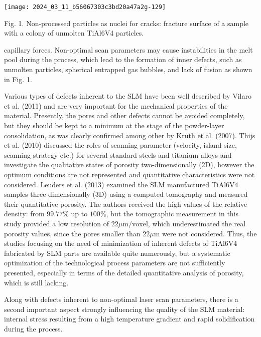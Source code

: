 \documentclass[10pt]{article}
\begin{document}
\begin{center}
\texttt{[image: 2024\_03\_11\_b56067303c3bd20a47a2g-129]}
\end{center}

Fig. 1. Non-processed particles as nuclei for cracks: fracture surface of a sample with a colony of unmolten TiAl6V4 particles.

capillary forces. Non-optimal scan parameters may cause instabilities in the melt pool during the process, which lead to the formation of inner defects, such as unmolten particles, spherical entrapped gas bubbles, and lack of fusion as shown in Fig. 1.

Various types of defects inherent to the SLM have been well described by Vilaro et al. (2011) and are very important for the mechanical properties of the material. Presently, the pores and other defects cannot be avoided completely, but they should be kept to a minimum at the stage of the powder-layer consolidation, as was clearly confirmed among other by Kruth et al. (2007). Thijs et al. (2010) discussed the roles of scanning parameter (velocity, island size, scanning strategy etc.) for several standard steels and titanium alloys and investigate the qualitative states of porosity two-dimensionally (2D), however the optimum conditions are not represented and quantitative characteristics were not considered. Leuders et al. (2013) examined the SLM manufactured TiAl6V4 samples three-dimensionally (3D) using a computed tomography and measured their quantitative porosity. The authors received the high values of the relative density: from $99.77 \%$ up to $100 \%$, but the tomographic measurement in this study provided a low resolution of $22 \mu \mathrm{m} / \mathrm{voxel}$, which underestimated the real porosity values, since the pores smaller than $22 \mu \mathrm{m}$ were not considered. Thus, the studies focusing on the need of minimization of inherent defects of TiAl6V4 fabricated by SLM parts are available quite numerously, but a systematic optimization of the technological process parameters are not sufficiently presented, especially in terms of the detailed quantitative analysis of porosity, which is still lacking.

Along with defects inherent to non-optimal laser scan parameters, there is a second important aspect strongly influencing the quality of the SLM material: internal stress resulting from a high temperature gradient and rapid solidification during the process.
\end{document}
